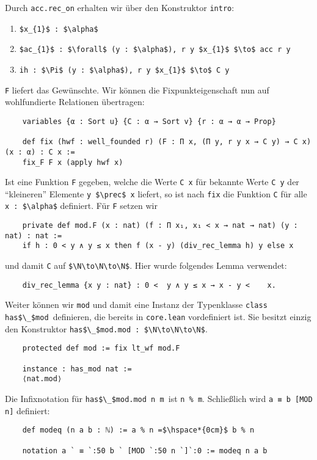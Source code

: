 \documentclass[a4paper,12pt]{scrartcl}
\newcommand{\N}{\mathbb N}
\begin{document}
	Durch \lstinline|acc.rec_on| erhalten wir über den Konstruktor \lstinline|intro|:
	\begin{enumerate}
		\item[] \lstinline|$x_{1}$ : $\alpha$|
		\item[] \lstinline|$ac_{1}$ : $\forall$ (y : $\alpha$), r y $x_{1}$ $\to$ acc r y|
		\item[] \lstinline|ih : $\Pi$ (y : $\alpha$), r y $x_{1}$ $\to$ C y|
	\end{enumerate}
	\lstinline|F| liefert das Gewünschte. Wir können die Fixpunkteigenschaft nun auf wohlfundierte Relationen übertragen:
	\begin{lstlisting}
	variables {α : Sort u} {C : α → Sort v} {r : α → α → Prop}
	
	def fix (hwf : well_founded r) (F : Π x, (Π y, r y x → C y) → C x) (x : α) : C x :=
	fix_F F x (apply hwf x)
	\end{lstlisting}
	Ist eine Funktion \lstinline|F| gegeben, welche die Werte \lstinline|C x| für bekannte Werte \lstinline|C y| der \enquote{kleineren} Elemente \lstinline|y $\prec$ x| liefert, so ist nach \lstinline|fix| die Funktion \lstinline|C| für alle \lstinline|x : $\alpha$| definiert. 
	Für \lstinline|F| setzen wir
	\begin{lstlisting}
	private def mod.F (x : nat) (f : Π x₁, x₁ < x → nat → nat) (y : nat) : nat :=
	if h : 0 < y ∧ y ≤ x then f (x - y) (div_rec_lemma h) y else x
	\end{lstlisting}
	und damit \lstinline|C| auf \lstinline|$\N\to\N\to\N$|. Hier wurde folgendes Lemma verwendet:
	\begin{lstlisting}
	div_rec_lemma {x y : nat} : 0 <	 y ∧ y ≤ x → x - y < 	x.
	\end{lstlisting}
	Weiter können wir \lstinline|mod| und damit eine Instanz der Typenklasse \lstinline|class has$\_$mod |definieren, die bereits in \lstinline|core.lean| vordefiniert ist. Sie besitzt einzig den Konstruktor \lstinline|has$\_$mod.mod : $\N\to\N\to\N$|.
	\begin{lstlisting}
	protected def mod := fix lt_wf mod.F
	
	instance : has_mod nat :=
	⟨nat.mod⟩
	\end{lstlisting}
	Die Infixnotation für \lstinline|has$\_$mod.mod n m |ist \lstinline|n % m|.
	Schließlich wird \lstinline|a ≡ b [MOD n]| definiert:
	\begin{lstlisting}
	def modeq (n a b : ℕ) := a % n =$\hspace*{0cm}$ b % n
	
	notation a ` ≡ `:50 b ` [MOD `:50 n `]`:0 := modeq n a b
	\end{lstlisting}
\end{document}
